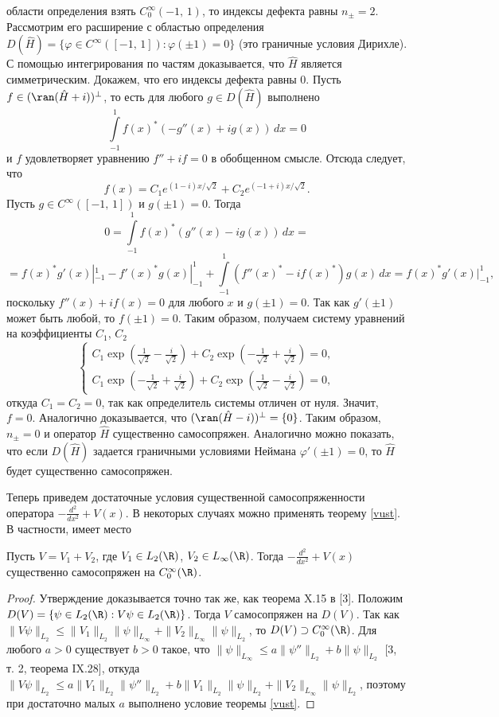 \documentclass[a4paper
]{article}
\begin{document}
области определения взять $C_0^\infty(-1, \, 1)$, то индексы дефекта
равны $n_{\pm}=2$. Рассмотрим его расширение с областью определения
$D(\hat H)=\{ \varphi\in C^\infty([-1, \, 1]):\varphi(\pm 1)=0\}$
(это граничные условия Дирихле). С
помощью интегрирования по частям доказывается, что $\hat H$ является
симметрическим. Докажем, что его индексы дефекта равны 0. Пусть
$f\in (\ran(\hat H+i))^{\bot}$, то есть для
любого $g\in D(\hat H)$ выполнено $$\int \limits _{-1}^{1} f(x)^*
(-g''(x)+ig(x))\, dx=0$$ и $f$ удовлетворяет уравнению
$f''+if=0$ в обобщенном смысле. Отсюда следует, что
$$f(x)=C_1e^{(1-i)x/\sqrt{2}}+C_2e^{(-1+i)x/\sqrt{2}}.$$ Пусть $g\in
C^\infty([-1, \, 1])$ и $g(\pm 1)=0$. Тогда
$$0=\int \limits _{-1}^1f(x)^*(g''(x)-ig(x))\, dx=$$
$$=f(x)^*g'(x)|_{-1}^{1}-f'(x)^*g(x)|_{-1}^{1}+\int \limits_{-1}^1
(f''(x)^*-if(x)^*)g(x)\, dx=f(x)^*g'(x)|_{-1}^1,$$ поскольку
$f''(x)+if(x)=0$ для любого $x$ и $g(\pm 1)=0$. Так как $g'(\pm 1)$
может быть любой, то $f(\pm 1)=0$. Таким образом, получаем систему
уравнений на коэффициенты $C_1$, $C_2$ $$\left\{\begin{array}{l}
C_1\exp\left(\frac{1}{\sqrt{2}}-\frac{i}{\sqrt{2}}\right)
+C_2\exp\left(-\frac{1}{\sqrt{2}}+\frac{i}{\sqrt{2}}\right)
=0, \\ C_1\exp\left(-\frac{1}{\sqrt{2}}+\frac{i}
{\sqrt{2}}\right)+C_2\exp\left(\frac{1}{\sqrt{2}}
-\frac{i}{\sqrt{2}}\right)=0,\end{array}\right.$$
откуда $C_1=C_2=0$, так как определитель системы отличен от нуля.
Значит, $f=0$. Аналогично доказывается, что $(\ran(\hat H-i))^{\bot}
=\{0\}$. Таким образом, $n_\pm=0$ и оператор $\hat H$ существенно самосопряжен.
Аналогично можно показать, что если $D(\hat H)$ задается граничными
условиями Неймана $\varphi'(\pm 1)=0$, то $\hat H$ будет существенно
самосопряжен. \par
Теперь приведем достаточные условия существенной самосопряженности
оператора $-\frac{d^2}{dx^2}+V(x)$. В некоторых случаях можно применять
теорему \ref{vust}. В частности, имеет место
\begin{Sta}
Пусть $V=V_1+V_2$, где $V_1\in L_2(\R)$, $V_2\in L_\infty(\R)$. Тогда
$-\frac{d^2}{dx^2}+V(x)$ существенно самосопряжен на $C_0^\infty(\R)$.
\end{Sta}
\begin{proof}
Утверждение доказывается точно так же, как теорема X.15 в [3].
Положим $D(V)=\{\psi\in L_2(\R):V\psi\in L_2(\R)\}$. Тогда $V$ самосопряжен
на $D(V)$. Так как $\|V\psi\|_{L_2}\le \|V_1\|_{L_2}\|\psi\|_{L_\infty}
+\|V_2\|_{L_\infty}\|\psi\|_{L_2}$, то $D(V)\supset C_0^\infty(\R)$.
Для любого $a>0$ существует $b>0$ такое, что $\|\psi\|_{L_\infty}
\le a\|\psi''\|_{L_2}+b\|\psi\|_{L_2}$ [3, т. 2, теорема IX.28],
откуда $\|V\psi\|_{L_2}\le a\|V_1\|_{L_2}\|\psi''\|_{L_2}+b\|V_1\|_{L_2}
\|\psi\|_{L_2}+\|V_2\|_{L_\infty}\|\psi\|_{L_2}$, поэтому при достаточно
малых $a$ выполнено условие теоремы \ref{vust}.
\end{proof}
\end{document}
